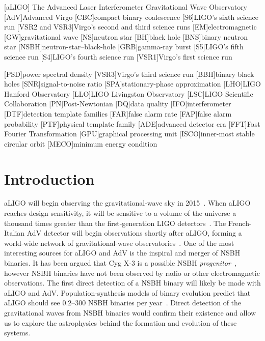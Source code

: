 


[aLIGO]
{The Advanced Laser Interferometer Gravitational Wave Observatory}
[AdV]{Advanced Virgo}
[CBC]{compact binary coalescence}
[S6]{LIGO's sixth science run}
[VSR2 and VSR3]{Virgo's second and third science runs}
[EM]{electromagnetic}
[GW]{gravitational wave}
[NS]{neutron star}
[BH]{black hole}
[BNS]{binary neutron star}
[NSBH]{neutron-star--black-hole}
[GRB]{gamma-ray burst}
[S5]{LIGO's fifth science run}
[S4]{LIGO's fourth science run}
[VSR1]{Virgo's first science run}

[PSD]{power spectral density}
[VSR3]{Virgo's third science run}
[BBH]{binary black holes}
[SNR]{signal-to-noise ratio}
[SPA]{stationary-phase approximation}
[LHO]{LIGO Hanford Observatory}
[LLO]{LIGO Livingston Observatory}
[LSC]{LIGO Scientific Collaboration}
[PN]{Post-Newtonian}
[DQ]{data quality}
[IFO]{interferometer}
[DTF]{detection template families}
[FAR]{false alarm rate}
[FAP]{false alarm probability}
[PTF]{physical template family}
[ADE]{advanced detector era}
[FFT]{Fast Fourier Transformation}
[GPU]{graphical processing unit}
[ISCO]{inner-most stable circular orbit}
[MECO]{minimum energy condition}

\section{Introduction}
\label{sec:intro}

\ac{aLIGO} will
begin observing the gravitational-wave sky in 2015~\cite{Aasi:2013wya}. When
\ac{aLIGO} reaches design sensitivity, it will be sensitive to a volume of the
universe a thousand times greater than the first-generation LIGO
detectors~\cite{Harry:2010zz}. The French-Italian \ac{AdV} detector
will begin observations shortly after \ac{aLIGO}, forming a world-wide network
of gravitational-wave
observatories~\cite{Aasi:2013wya,aVirgo,AdV2}.
One of the most interesting sources for \ac{aLIGO} and \ac{AdV} is the inspiral
and merger of \ac{NSBH} binaries. It has been argued that
Cyg X-3 is a possible \ac{NSBH} \emph{progenitor}~\cite{Belczynski:2012jc},
however \ac{NSBH} binaries have not been observed by radio or other
electromagnetic observations. The first direct detection of a \ac{NSBH} binary
will likely be made with \ac{aLIGO} and \ac{AdV}. Population-synthesis models 
of binary evolution predict
that \ac{aLIGO} should see 0.2--300 \ac{NSBH} binaries per
year~\cite{Abadie:2010cf}. Direct detection of the gravitational waves from NSBH
binaries would confirm their existence and allow us to explore the astrophysics
behind the formation and evolution of these systems.

